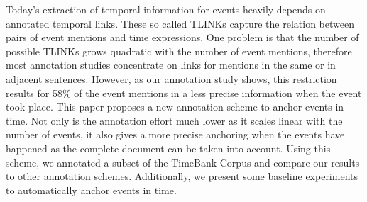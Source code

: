 Today's extraction of temporal information for events heavily depends on annotated temporal links. These so called TLINKs capture the relation between pairs of event mentions and time expressions. One problem is that the number of possible TLINKs grows quadratic with the number of event mentions, therefore most annotation studies concentrate on links for mentions in the same or in adjacent sentences. However, as our annotation study shows, this restriction results for 58\% of the event mentions in a less precise information when the event took place. This paper proposes a new annotation scheme to anchor events in time. Not only is the annotation effort much lower as it scales linear with the number of events, it also gives a more precise anchoring when the events have happened as the complete document can be taken into account. Using this scheme, we annotated a subset of the TimeBank Corpus and compare our results to other annotation schemes. Additionally, we present some baseline experiments to automatically anchor events in time.
